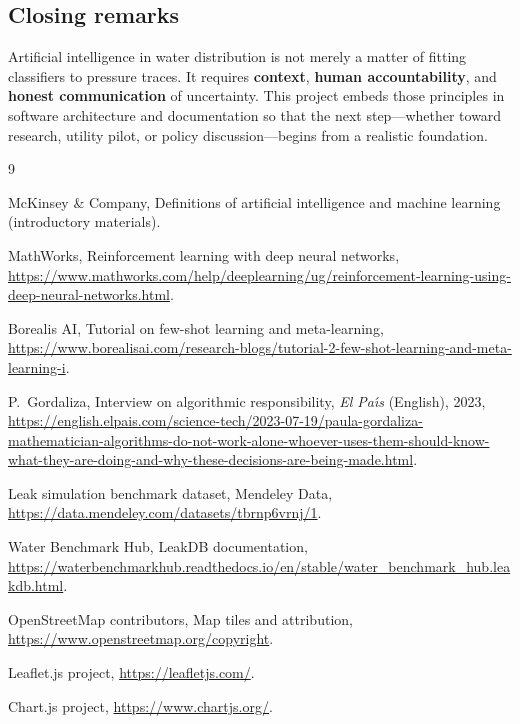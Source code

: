 \documentclass[12pt,a4paper]{article}
\begin{document}
\subsection{Closing remarks}

Artificial intelligence in water distribution is not merely a matter of fitting classifiers to pressure traces. It requires \textbf{context}, \textbf{human accountability}, and \textbf{honest communication} of uncertainty. This project embeds those principles in software architecture and documentation so that the next step---whether toward research, utility pilot, or policy discussion---begins from a realistic foundation.

\begin{thebibliography}{9}

McKinsey \& Company, Definitions of artificial intelligence and machine learning (introductory materials).

MathWorks, Reinforcement learning with deep neural networks, \url{https://www.mathworks.com/help/deeplearning/ug/reinforcement-learning-using-deep-neural-networks.html}.

Borealis AI, Tutorial on few-shot learning and meta-learning, \url{https://www.borealisai.com/research-blogs/tutorial-2-few-shot-learning-and-meta-learning-i}.

P.~Gordaliza, Interview on algorithmic responsibility, \emph{El Pa\'{\i}s} (English), 2023, \url{https://english.elpais.com/science-tech/2023-07-19/paula-gordaliza-mathematician-algorithms-do-not-work-alone-whoever-uses-them-should-know-what-they-are-doing-and-why-these-decisions-are-being-made.html}.

Leak simulation benchmark dataset, Mendeley Data, \url{https://data.mendeley.com/datasets/tbrnp6vrnj/1}.

Water Benchmark Hub, LeakDB documentation, \url{https://waterbenchmarkhub.readthedocs.io/en/stable/water_benchmark_hub.leakdb.html}.

OpenStreetMap contributors, Map tiles and attribution, \url{https://www.openstreetmap.org/copyright}.

Leaflet.js project, \url{https://leafletjs.com/}.

Chart.js project, \url{https://www.chartjs.org/}.

\end{thebibliography}
\end{document}
